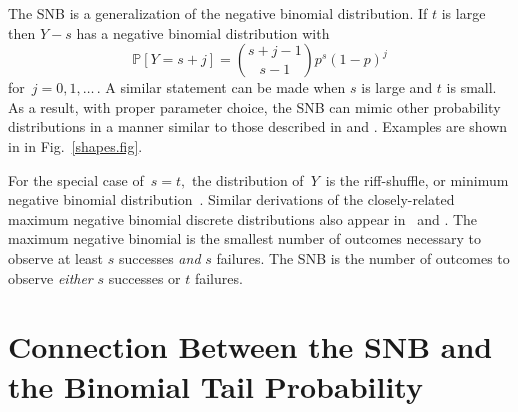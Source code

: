 \documentclass[review]{elsarticle}
\begin{document}
The SNB is a generalization of the negative 
binomial distribution. If $t$ is large then $Y-s$ has a 
negative binomial distribution with
\begin{equation*}                                    %
\mathbb{P}[Y=s+j]        \label{nb1.eq}          
  = {{s+j-1}\choose{s-1}} p^s (1-p)^j
\end{equation*}
for $\,j=0, 1,\ldots\,$. A similar statement can be made when $s$ is large
and $t$ is small. As a result, with proper parameter choice, the SNB
can mimic other probability distributions in a manner similar to 
those described in \cite{Peizer1968} and \cite{Best1974}. Examples are
shown in in Fig.~\ref{shapes.fig}. 

For the special case of $\,s=t,$ the distribution of $\,Y\,$ is the
riff-shuffle, or minimum negative binomial distribution~\citep{Uppuluri1970}.
Similar derivations of the closely-related maximum negative binomial 
discrete distributions also appear in~\cite{Zhang2000}
and \cite{Zelterman2005}.
The maximum negative binomial is the smallest number of outcomes necessary to 
observe at least $s$ successes {\em and} $s$ failures. The SNB is the 
number of outcomes to observe {\em either} $s$ successes or $t$ failures.

\section{Connection Between the SNB and the Binomial Tail Probability}
\end{document}
